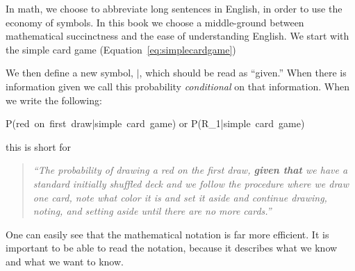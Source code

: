 In math, we choose to abbreviate long sentences in English, in order to use the economy of symbols.  In this book we choose a middle-ground between mathematical succinctness and the ease of understanding English.  We start with the simple card game (Equation~\ref{eq:simplecardgame})

We then define a new symbol, $|$, which should be read as ``given.''  When there is information given we call this probability {\em conditional} on that information.  When we write the following:

\beq
P(\mbox{red on first draw}|\mbox{simple card game})
\label{eq:card1}
\eeq
or
\beq
P(R_{1}|\mbox{simple card game})
\label{eq:card1a}
\eeq

this is short for 

\begin{quote}{\it ``The probability of drawing a red on the first draw, {\bf given that} we have a standard initially shuffled deck and we follow the procedure where we draw one card, note what color it is and set it aside and continue drawing, noting, and setting aside until there are no more cards.''}
\end{quote}

One can easily see that the mathematical notation is far more efficient. It is important to be able to read the notation, because it describes what we know and what we want to know.  


